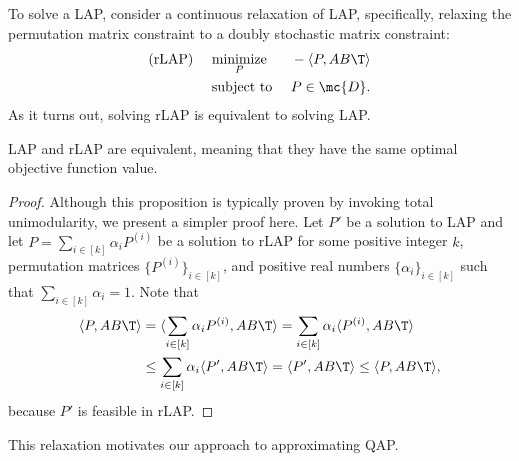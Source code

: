 \documentclass[10pt,journal,cspaper,compsoc]{IEEEtran}
\begin{document}
To solve a LAP, consider a continuous relaxation of LAP, specifically, relaxing the permutation matrix constraint to a doubly stochastic matrix constraint:
\begin{subequations} \label{eq:rLAP}
\begin{align}
		\text{(rLAP) } \quad &\underset{P}{\text{minimize}}  &&-\langle P, AB\T \rangle \\
		&\text{subject to } && P \in \mc{D}.
\end{align}
\end{subequations}
As it turns out, solving rLAP is equivalent to solving LAP.
\begin{prop}
	LAP and rLAP are equivalent, meaning that they have the same optimal objective function value.
\end{prop}
\begin{proof}
	Although this proposition is typically proven by invoking total unimodularity, we present a simpler proof here.	Let $P'$ be a solution to LAP and let $P = \sum_{i\in[k]} \alpha_i P^{(i)}$ be a solution to rLAP for some positive integer $k$, permutation matrices $\{P^{(i)}\}_{i \in [k]}$, and positive real numbers $\{\alpha_i\}_{i \in[k]}$ such that $\sum_{i \in [k]} \alpha_i=1$.  Note that 
	\begin{align*}
	\langle P,AB\T \rangle &= \langle  \sum_{i\in[k]} \alpha_i P^{(i)}, AB\T \rangle=  \sum_{i\in[k]} \alpha_i \langle  P^{(i)}, AB\T \rangle	 \\
	&\leq \sum_{i\in[k]} \alpha_i \langle P', AB\T  \rangle = \langle P', AB\T \rangle \leq \langle P, AB\T \rangle,
	\end{align*}
	because $P'$ is feasible in rLAP.
	\end{proof}
This relaxation motivates our approach to approximating QAP.
\end{document}
